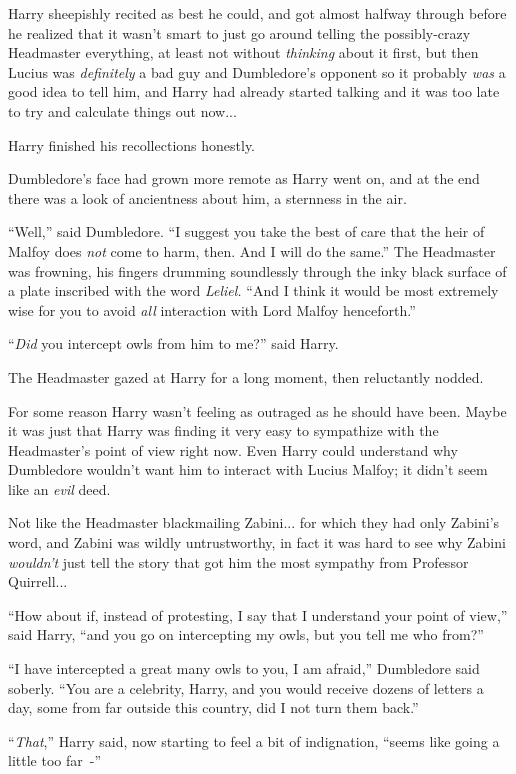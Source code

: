 Harry sheepishly recited as best he could, and got almost halfway through before he realized that it wasn't smart to just go around telling the possibly-crazy Headmaster everything, at least not without \emph{thinking} about it first, but then Lucius was \emph{definitely} a bad guy and Dumbledore's opponent so it probably \emph{was} a good idea to tell him, and Harry had already started talking and it was too late to try and calculate things out now...

Harry finished his recollections honestly.

Dumbledore's face had grown more remote as Harry went on, and at the end there was a look of ancientness about him, a sternness in the air.

``Well,'' said Dumbledore. ``I suggest you take the best of care that the heir of Malfoy does \emph{not} come to harm, then. And I will do the same.'' The Headmaster was frowning, his fingers drumming soundlessly through the inky black surface of a plate inscribed with the word \emph{Leliel.} ``And I think it would be most extremely wise for you to avoid \emph{all} interaction with Lord Malfoy henceforth.''

``\emph{Did} you intercept owls from him to me?'' said Harry.

The Headmaster gazed at Harry for a long moment, then reluctantly nodded.

For some reason Harry wasn't feeling as outraged as he should have been. Maybe it was just that Harry was finding it very easy to sympathize with the Headmaster's point of view right now. Even Harry could understand why Dumbledore wouldn't want him to interact with Lucius Malfoy; it didn't seem like an \emph{evil} deed.

Not like the Headmaster blackmailing Zabini... for which they had only Zabini's word, and Zabini was wildly untrustworthy, in fact it was hard to see why Zabini \emph{wouldn't} just tell the story that got him the most sympathy from Professor Quirrell...

``How about if, instead of protesting, I say that I understand your point of view,'' said Harry, ``and you go on intercepting my owls, but you tell me who from?''

``I have intercepted a great many owls to you, I am afraid,'' Dumbledore said soberly. ``You are a celebrity, Harry, and you would receive dozens of letters a day, some from far outside this country, did I not turn them back.''

``\emph{That},'' Harry said, now starting to feel a bit of indignation, ``seems like going a little too far~-''

